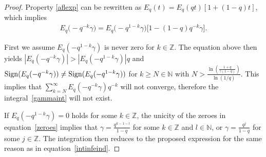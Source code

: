 \documentclass[pdftex]{sigma}
\newcommand{\mN}{\mathbb{N}}
\newcommand{\mZ}{\mathbb{Z}}
\numberwithin{equation}{section}
\begin{document}
\begin{proof}
Property \eqref{aflexp} can be rewritten as $E_q(t)=E_q(qt)\left[1+(1-q)t\right]$, which implies
\begin{gather*}
E_q\big({-}q^{-k}\gamma\big) = E_q\big({-}q^{1-k}\gamma\big)\big[1-(1-q)q^{-k}\gamma\big].
\end{gather*}

First we assume $E_q(-q^{1-k}\gamma)$ is never zero for $k\in\mZ$. The equation above then yields $\left|E_q(-q^{-k}\gamma)\right|>\left|E_q(-q^{1-k}\gamma)\right|q$ and ${\rm Sign}(E_q(-q^{-k}\gamma))\not={\rm Sign}(E_q(-q^{1-k}\gamma))$ for $k\ge N\in\mN$ with $N>\frac{\ln\left(\frac{1+q}{\gamma(1-q)}\right)}{\ln(1/q)}$. This implies that $\sum\limits_{k=N}^\infty E_q(-q^{-k}\gamma)q^{-k}$ will not converge, therefore the integral~\eqref{gammaint} will not exist.

If $E_q(-q^{1-k}\gamma)=0$ holds for some $k\in\mZ$, the unicity of the zeroes in equation~\eqref{zeroes} implies that $\gamma=\frac{q^{k-1-l}}{1-q}$ for some $k\in\mZ$ and $l\in\mN$, or $\gamma=\frac{q^{j}}{1-q}$ for some $j\in\mZ$. The integration then reduces to the proposed expression for the same reason as in equation~\eqref{intinfeind}.
\end{proof}
\end{document}
